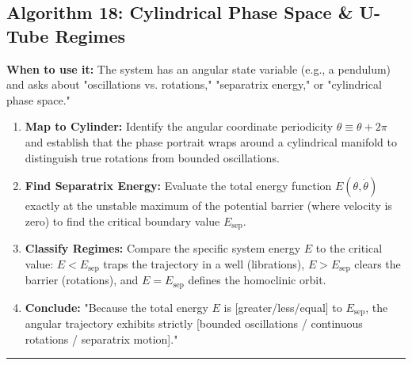 \documentclass[11pt, a4paper]{report}
\begin{document}
\subsection*{Algorithm 18: Cylindrical Phase Space \& U-Tube Regimes}
\textbf{When to use it:} The system has an angular state variable (e.g., a pendulum) and asks about "oscillations vs. rotations," "separatrix energy," or "cylindrical phase space."
\begin{enumerate}[label=\textbf{\arabic*.}]
    \item \textbf{Map to Cylinder:} Identify the angular coordinate periodicity $\theta \equiv \theta + 2\pi$ and establish that the phase portrait wraps around a cylindrical manifold to distinguish true rotations from bounded oscillations.
    \item \textbf{Find Separatrix Energy:} Evaluate the total energy function $E(\theta, \dot{\theta})$ exactly at the unstable maximum of the potential barrier (where velocity is zero) to find the critical boundary value $E_{\text{sep}}$.
    \item \textbf{Classify Regimes:} Compare the specific system energy $E$ to the critical value: $E < E_{\text{sep}}$ traps the trajectory in a well (librations), $E > E_{\text{sep}}$ clears the barrier (rotations), and $E = E_{\text{sep}}$ defines the homoclinic orbit.
    \item \textbf{Conclude:} "Because the total energy $E$ is [greater/less/equal] to $E_{\text{sep}}$, the angular trajectory exhibits strictly [bounded oscillations / continuous rotations / separatrix motion]."
\end{enumerate}
\vspace{1em}
\noindent\rule{\textwidth}{0.4pt}
\vspace{1em}
\end{document}
